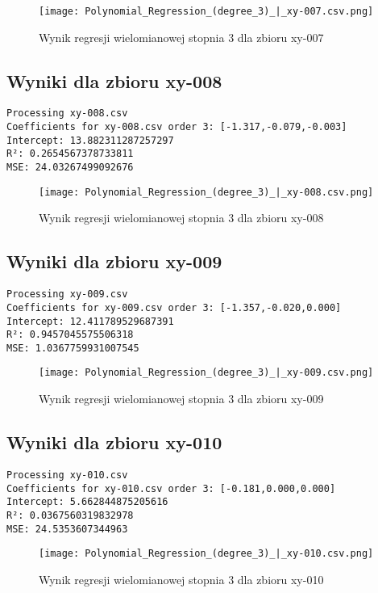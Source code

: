 \documentclass{article}
\begin{document}
\begin{figure}[H]
    \centering
    \texttt{[image: Polynomial\_Regression\_(degree\_3)\_|\_xy-007.csv.png]}
    \caption{Wynik regresji wielomianowej stopnia 3 dla zbioru xy-007}
\end{figure}

\subsection{Wyniki dla zbioru xy-008}
\begin{verbatim}
Processing xy-008.csv
Coefficients for xy-008.csv order 3: [-1.317,-0.079,-0.003]
Intercept: 13.882311287257297
R²: 0.2654567378733811
MSE: 24.03267499092676
\end{verbatim}

\begin{figure}[H]
    \centering
    \texttt{[image: Polynomial\_Regression\_(degree\_3)\_|\_xy-008.csv.png]}
    \caption{Wynik regresji wielomianowej stopnia 3 dla zbioru xy-008}
\end{figure}

\subsection{Wyniki dla zbioru xy-009}
\begin{verbatim}
Processing xy-009.csv
Coefficients for xy-009.csv order 3: [-1.357,-0.020,0.000]
Intercept: 12.411789529687391
R²: 0.9457045575506318
MSE: 1.0367759931007545
\end{verbatim}

\begin{figure}[H]
    \centering
    \texttt{[image: Polynomial\_Regression\_(degree\_3)\_|\_xy-009.csv.png]}
    \caption{Wynik regresji wielomianowej stopnia 3 dla zbioru xy-009}
\end{figure}

\subsection{Wyniki dla zbioru xy-010}
\begin{verbatim}
Processing xy-010.csv
Coefficients for xy-010.csv order 3: [-0.181,0.000,0.000]
Intercept: 5.662844875205616
R²: 0.0367560319832978
MSE: 24.5353607344963
\end{verbatim}

\begin{figure}[H]
    \centering
    \texttt{[image: Polynomial\_Regression\_(degree\_3)\_|\_xy-010.csv.png]}
    \caption{Wynik regresji wielomianowej stopnia 3 dla zbioru xy-010}
\end{figure}
\end{document}
